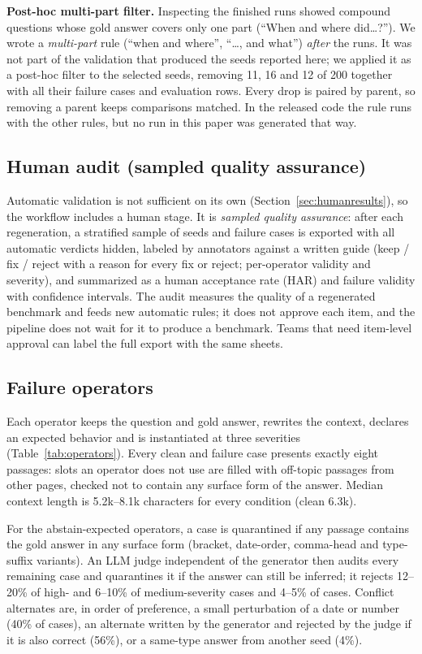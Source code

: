 \documentclass[conference]{IEEEtran}
\newcommand{\op}[1]{\texttt{\detokenize{#1}}}
\begin{document}
\textbf{Post-hoc multi-part filter.} Inspecting the finished runs showed compound questions whose
gold answer covers only one part (``When and where did\dots?''). We wrote a \emph{multi-part}
rule (``when and where'', ``\dots, and what'') \emph{after} the runs. It was not part of the
validation that produced the seeds reported here; we applied it as a post-hoc filter to the
selected seeds, removing 11, 16 and 12 of 200 together with all their failure cases and
evaluation rows. Every drop is paired by parent, so removing a parent keeps comparisons matched.
In the released code the rule runs with the other rules, but no run in this paper was generated
that way.

\subsection{Human audit (sampled quality assurance)}
\label{sec:audit}
Automatic validation is not sufficient on its own (Section~\ref{sec:humanresults}), so the
workflow includes a human stage. It is \emph{sampled quality assurance}: after each
regeneration, a stratified sample of seeds and failure cases is exported with all automatic verdicts hidden, labeled by
annotators against a written guide (keep / fix / reject with a reason for every fix or reject;
per-operator validity and severity), and summarized as a human acceptance rate (HAR) and failure
validity with confidence intervals. The audit measures the quality of a regenerated benchmark
and feeds new automatic rules; it does not approve each item, and the pipeline does not wait for
it to produce a benchmark. Teams that need item-level approval can label the full export with
the same sheets.

\subsection{Failure operators}
\label{sec:operators}
Each operator keeps the question and gold answer, rewrites the context, declares an expected
behavior and is instantiated at three severities (Table~\ref{tab:operators}). Every clean and
failure case presents exactly eight passages: slots an operator does not use are filled with
off-topic passages from other pages, checked not to contain any surface form of the answer.
Median context length is 5.2k--8.1k characters for every condition (clean 6.3k).

For the abstain-expected operators, a case is quarantined if any passage contains the gold
answer in any surface form (bracket, date-order, comma-head and type-suffix variants). An LLM
judge independent of the generator then audits every remaining case and quarantines it if the
answer can still be inferred; it rejects 12--20\% of high- and 6--10\% of medium-severity
\op{missing_evidence} cases and 4--5\% of \op{hard_negative} cases. Conflict alternates are,
in order of preference, a small perturbation of a date or number (40\% of cases), an
alternate written by the generator and rejected by the judge if it is also correct (56\%), or a
same-type answer from another seed (4\%).
\end{document}
